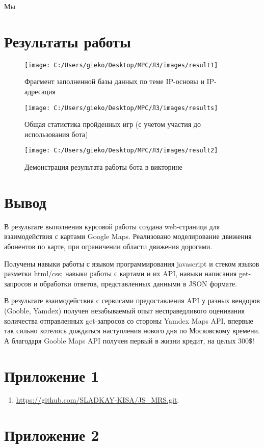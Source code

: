 \documentclass[a4paper]{article}
\begin{document}
\begin{onehalfspacing}
Мы 



\clearpage


\section{Результаты работы}
\begin{figure}[h!]
	\centering
	\texttt{[image: C:/Users/gieko/Desktop/МРС/Л3/images/result1]}
	\caption{Фрагмент заполненной базы данных по теме IP-основы и  IP-адресация}
	\label{fig:mpr}
\end{figure}
\begin{figure}[h!]
\centering
\texttt{[image: C:/Users/gieko/Desktop/МРС/Л3/images/results]}
\caption{Общая статистика пройденных игр (с учетом участия до использования бота)}
\label{fig:mpr}
\end{figure}
\begin{figure}[h!]
	\centering
	\texttt{[image: C:/Users/gieko/Desktop/МРС/Л3/images/result2]}
	\caption{Демонстрация результата работы бота в викторине}
	\label{fig:mpr}
\end{figure}

\clearpage
\section{Вывод}

\tab В результате выполнения курсовой работы создана web-страница для взаимодействия с картами Google Maps. Реализовано моделирование движения абонентов по карте, при ограничении области движения дорогами.

Получены навыки работы с языком программирования javascript и стеком языков разметки html/css; навыки работы с картами и их API, навыки написания get-запросов и обработки ответов, представленных данными в JSON формате. 

В результате взаимодействия с сервисами предоставления API у разных вендоров (Gooble, Yamdex) получен незабываемый опыт несправедливого оценивания количества отправленных get-запросов со стороны Yamdex Maps API, впервые так сильно хотелось дождаться наступления нового дня по Московскому времени. А благодаря Gooble Maps API получен первый в жизни кредит, на целых 300\$!

\section*{Приложение 1}
\begin{enumerate}
	\item \href {https://github.com/SLADKAY-KISA/JS_MRS.git}{https://github.com/SLADKAY-KISA/JS\_MRS.git}.
\end{enumerate}
\end{onehalfspacing}

\clearpage
\section*{Приложение 2}
\end{document}
